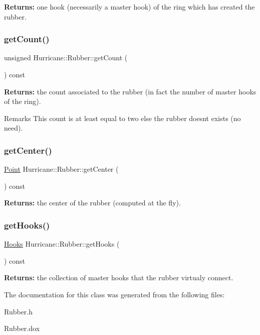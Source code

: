 {\bfseries Returns\+:} one hook (necessarily a master hook) of the ring which has created the rubber. \mbox{\label{classHurricane_1_1Rubber_a5fbe74e46313c0c1a264f0c7bda11e94}} 
\subsubsection{\texorpdfstring{get\+Count()}{getCount()}}
{\footnotesize\ttfamily unsigned Hurricane\+::\+Rubber\+::get\+Count (\begin{DoxyParamCaption}{ }\end{DoxyParamCaption}) const\hspace{0.3cm}{\ttfamily [inline]}}

{\bfseries Returns\+:} the count associated to the rubber (in fact the number of master hooks of the ring).

\begin{DoxyRemark}{Remarks}
This count is at least equal to two else the rubber doesn\textquotesingle{}t exists (no need). 
\end{DoxyRemark}
\mbox{\label{classHurricane_1_1Rubber_a124ef92401fd95ff794e381acd24e4ff}} 
\subsubsection{\texorpdfstring{get\+Center()}{getCenter()}}
{\footnotesize\ttfamily \mbox{\hyperlink{classHurricane_1_1Point}{Point}} Hurricane\+::\+Rubber\+::get\+Center (\begin{DoxyParamCaption}{ }\end{DoxyParamCaption}) const}

{\bfseries Returns\+:} the center of the rubber (computed at the fly). \mbox{\label{classHurricane_1_1Rubber_a6d87ff89d80fbaeeb6fea4157b92d1e3}} 
\subsubsection{\texorpdfstring{get\+Hooks()}{getHooks()}}
{\footnotesize\ttfamily \mbox{\hyperlink{namespaceHurricane_a9dcd9b74dc5e2b51bec7a13c25807e02}{Hooks}} Hurricane\+::\+Rubber\+::get\+Hooks (\begin{DoxyParamCaption}{ }\end{DoxyParamCaption}) const}

{\bfseries Returns\+:} the collection of master hooks that the rubber virtualy connect. 

The documentation for this class was generated from the following files\+:\begin{DoxyCompactItemize}
\item 
Rubber.\+h\item 
Rubber.\+dox\end{DoxyCompactItemize}
